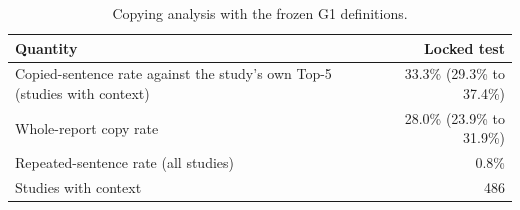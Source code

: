 \begin{table}[t]
\centering
\scriptsize
\begin{tabular}{lr}
\hline
Quantity & Locked test \\
\hline
Copied-sentence rate against the study's own Top-5 (studies with context) & 33.3\% (29.3\% to 37.4\%) \\
Whole-report copy rate & 28.0\% (23.9\% to 31.9\%) \\
Repeated-sentence rate (all studies) & 0.8\% \\
Studies with context & 486 \\
\hline
\end{tabular}
\caption{Copying analysis with the frozen G1 definitions.}
\label{tab:table12_supplementary_copying}
\end{table}
